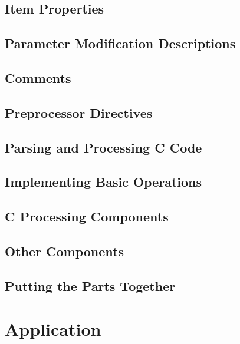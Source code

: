 \documentclass[a4paper]{report}
\begin{document}
\section{Item Properties}
\label{impl-itemprops}


\section{Parameter Modification Descriptions}
\label{impl-parmod}


\section{Comments}
\label{impl-comments}


\section{Preprocessor Directives}
\label{impl-preprocessor}


\section{Parsing and Processing C Code}
\label{impl-ccode}


\section{Implementing Basic Operations}
\label{impl-operations}


\section{C Processing Components}
\label{impl-ccomps}


\section{Other Components}
\label{impl-ocomps}


\section{Putting the Parts Together}
\label{impl-all}


\chapter{Application}
\end{document}
